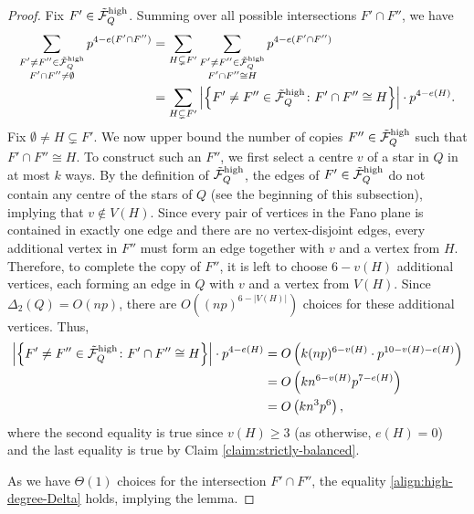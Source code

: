 \documentclass[11pt,a4paper,oneside,reqno]{amsart}
\newcommand{\cF}{\mathcal{F}}
\newcommand{\1}{\mathbbm{1}} %
\renewcommand{\ge}{\geqslant}
\newcommand{\cTFQH}{\Tilde{\cF}_Q^{\mathrm{high}}}
\newcommand{\ext}{\mathrm{ext}}
\begin{document}
\begin{proof}
    Fix $F' \in \cTFQH$. Summing over all possible intersections $F' \cap F''$, we have
    \begin{align*}
        \sum_{\substack{F' \neq F'' \in \cTFQH \\ F' \cap F'' \neq \emptyset}} p^{4-e(F' \cap F'')} &= \sum_{H \subsetneq F'} \sum_{\substack{F' \neq F'' \in \cTFQH \\ F' \cap F'' \cong H}} p^{4-e(F' \cap F'')} \\
        &= \sum_{H \subsetneq F'} \left|\left\{F' \neq F'' \in \cTFQH \colon F' \cap F'' \cong H\right\}\right| \cdot p^{4 - e(H)}.
    \end{align*}    
    Fix $\emptyset \neq H \subsetneq F'$. We now upper bound the number of copies $F'' \in \cTFQH$ such that $F' \cap F'' \cong H$. To construct such an $F''$, we first select a centre $v$ of a star in $Q$ in at most $k$ ways. By the definition of $\cTFQH$, the edges of $F' \in \cTFQH$ do not contain any centre of the stars of $Q$ (see the beginning of this subsection), implying that $v \notin V(H)$. Since every pair of vertices in the Fano plane is contained in exactly one edge and there are no vertex-disjoint edges,  every additional vertex in $F''$ must form an edge together with $v$ and a vertex from $H$. Therefore, to complete the copy of $F''$, it is left to choose $6-v(H)$ additional vertices, each forming an edge in $Q$ with $v$ and a vertex from $V(H)$. Since $\Delta_2(Q) = O(np)$, there are $O\left((n p)^{6 - |V(H)|}\right)$ choices for these additional vertices. Thus,
    \begin{align*}
        \left|\left\{F' \neq F'' \in \cTFQH \colon F' \cap F'' \cong H\right\}\right| \cdot p^{4 - e(H)} &= O\left(k (np)^{6 - v(H)} \cdot p^{10 - v(H) - e(H)}\right)\\& = O\left(k n^{6-v(H)} p^{7-e(H)}\right) \\&= O\left(k n^3 p^6\right),
    \end{align*}
    where the second equality is true since $v(H) \ge 3$ (as otherwise, $e(H) = 0$) and the last equality is true by Claim \ref{claim:strictly-balanced}.

    As we have $\Theta(1)$ choices for the intersection $F' \cap F''$, the equality \eqref{align:high-degree-Delta} holds, implying the lemma. \qedhere

    

\end{proof}
\end{document}
